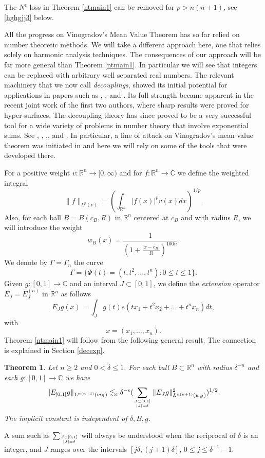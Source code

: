 \documentclass[amssymb,amsfonts,12pt]{amsart}
\newtheorem{theorem}{Theorem}[section]
\def\R{{\mathbb R}}
\def\C{{\mathbb C}}
\begin{document}
The $N^\epsilon$ loss in Theorem \ref{ntmain1} can be removed for $p>n(n+1)$, see \eqref{hghgjj3} below.
\bigskip

All the progress  on Vinogradov's Mean Value Theorem has so far relied on number theoretic methods.  We will take a different approach here, one that relies solely on harmonic analysis techniques. The consequences of our approach will be far more general than Theorem \ref{ntmain1}. In particular we will see that integers can be replaced with arbitrary well separated real numbers. The relevant machinery that we now call {\em decouplings}, showed its initial potential for applications in  papers such as \cite{TWol}, \cite{GarSe2}, \cite{PrSe} and \cite{Bo2}. Its full strength became apparent in the recent joint work \cite{BD3} of the first two authors, where sharp results were proved for hyper-surfaces. The decoupling theory has since proved to be a very successful tool for a wide variety of problems in number theory that involve exponential sums. See  \cite{Bo}, \cite{Bo6}, \cite{BD6},\cite{BD4}, \cite{BD5} and \cite{BW}. In particular, a line of attack on Vinogradov's mean value theorem was initiated in \cite{BD4} and here we will rely on some of the tools that were developed there.
\bigskip


For a positive weight $v:\R^n\to[0,\infty)$ and for $f:\R^n\to\C$ we define the weighted integral
$$\|f\|_{L^p(v)}=(\int_{\R^n}|f(x)|^pv(x)dx)^{1/p}.$$
Also, for each ball $B=B(c_B,R)$ in $\R^n$ centered at $c_B$ and with radius $R$, we will introduce the weight
$$w_{B}(x)= \frac{1}{(1+\frac{|x-c_B|}{R})^{100n}}.$$
We denote by $\Gamma=\Gamma_n$ the curve
\begin{equation}
\label{ryvbt78y783956t787034r894}
\Gamma=\{\Phi(t)=(t,t^2,\ldots,t^n):0\le t\le 1\}.
\end{equation}
Given $g:[0,1]\to \C$ and an interval $J\subset [0,1]$,  we define the {\em extension} operator $E_J=E^{(n)}_J$ in $\R^n$ as follows
$$E_Jg(x)=\int_Jg(t)e(tx_1+t^2x_2+\ldots +t^nx_n)dt,$$
with
$$x=(x_1,\ldots,x_n).$$
Theorem \ref{ntmain1} will follow from the following general result. The connection is explained in Section \ref{decexp}.
\begin{theorem}
\label{ntmain}
Let $n\ge 2$ and $0<\delta\le 1$.
For each ball $B\subset \R^n$ with radius $\delta^{-n}$ and each $g:[0,1]\to\C$ we have
$$\|E_{[0,1]}g\|_{L^{n(n+1)}(w_B)}\lesssim_{\epsilon}\delta^{-\epsilon}(\sum_{J\subset [0,1]\atop{|J|=\delta}}\|E_Jg\|_{L^{n(n+1)}(w_B)}^2)^{1/2}.$$
The implicit constant is independent of $\delta,B,g$.
\end{theorem}
A sum such as
$\sum_{J\subset [0,1]\atop{|J|=\delta}}$
will always be understood when the reciprocal of $\delta$ is an integer, and $J$ ranges over the intervals $[j\delta,(j+1)\delta]$, $0\le j\le \delta^{-1}-1$.
\end{document}
